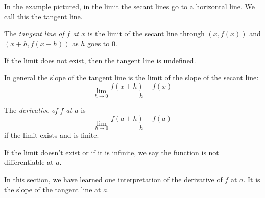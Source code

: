 \documentclass[11pt]{book}
\newenvironment{definition}[1][Definition]{\begin{trivlist}
\item[\hskip \labelsep {\bfseries #1}]}{\end{trivlist}}
\numberwithin{example}{chapter}
\begin{document}
In the example pictured, in the limit the secant lines go to a horizontal line.  We call this the tangent line.
\begin{center}
\end{center}


\begin{definition}
The \emph{tangent line of $f$ at $x$} is the limit of the secant line through $(x,f(x))$ and $(x+h,f(x+h))$ as $h$ goes to 0.  
\end{definition}

If the limit does not exist, then the tangent line is undefined.

In general the slope of the tangent line is the limit of the slope of the secant line:
$$\lim_{h\to 0} \frac{f(x+h)-f(x)}{h}$$




\begin{definition}
The \emph{derivative of $f$ at $a$} is 
$$\lim_{h\to 0} \frac{f(a+h)-f(a)}{h}$$
if the limit exists and is finite.
\end{definition}

If the limit doesn't exist or if it is infinite, we say the function is not differentiable at $a$.

In this section, we have learned one interpretation of the derivative of $f$ at $a$.  It is the slope of the tangent line at $a$.  
\end{document}
